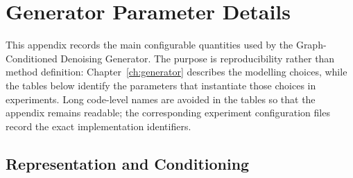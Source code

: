 
\appendix

\chapter{Generator Parameter Details}

\label{app:generator-parameters}
This appendix records the main configurable quantities used by the
Graph-Conditioned Denoising Generator. The purpose is
reproducibility rather than method definition: Chapter~\ref{ch:generator}
describes the modelling choices, while the tables below identify the
parameters that instantiate those choices in experiments. Long code-level
names are avoided in the tables so that the appendix remains readable; the
corresponding experiment configuration files record the exact implementation
identifiers.

\section{Representation and Conditioning}

